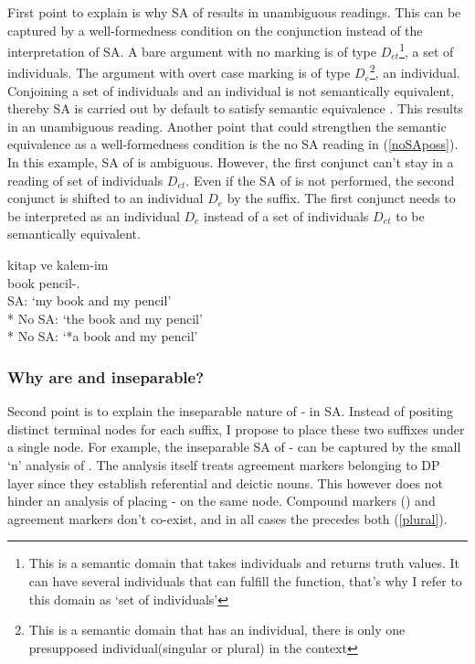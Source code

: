 First point to explain is why SA of {\Case} results in unambiguous readings. This can be captured by a well-formedness condition on the conjunction instead of the interpretation of SA. A bare argument with no {\Case} marking is of type $D_{et}$\footnote{This is a semantic domain that takes individuals and returns truth values. It can have several individuals that can fulfill the function, that's why I refer to this domain as `set of individuals'}, a set of individuals. The argument with overt case marking is of type $D_e$\footnote{This is a semantic domain that has an individual, there is only one presupposed individual(singular or plural) in the context}, an individual. Conjoining a set of individuals and an individual is not semantically equivalent, thereby {\Case} SA is carried out by default to satisfy semantic equivalence \citep{munn1993topics}. This results in an unambiguous reading. Another point that could strengthen the semantic equivalence as a well-formedness condition is the no SA reading in (\ref{noSAposs}). In this example, SA of {\Poss} is ambiguous. However, the first conjunct can't stay in a reading of set of individuals $D_{et}$. Even if the SA of {\Poss} is not performed, the second conjunct is shifted to an individual $D_e$ by the {\Poss} suffix. The first conjunct needs to be interpreted as an individual $D_{e}$ instead of a set of individuals $D_{et}$ to be semantically equivalent.

\begin{exe}
    \ex \label{noSAposs}
    \gll kitap ve kalem-im \\ book {\And} pencil-{\Poss.\Fsg} \\
    \glt SA: `my book and my pencil'\\*
    No SA: `the book and my pencil'\\*
    No SA: `*a book and my pencil'
\end{exe}


\subsubsection{Why are {\Pl} and {\Poss} inseparable?}

Second point is to explain the inseparable nature of {\Pl-\Poss} in SA. Instead of positing distinct terminal nodes for each suffix, I propose to place these two suffixes under a single node. For example, the inseparable SA of {\Pl-\Poss} can be captured by the small `n' analysis of \citet{ozturk2016possessive}. The analysis itself treats agreement markers belonging to DP layer since they establish referential and deictic nouns. This however does not hinder an analysis of placing {\Pl-\Poss} on the same node. Compound markers ({\Tsg}) and agreement markers don't co-exist, and in all cases the {\Pl} precedes both (\ref{plural}).

